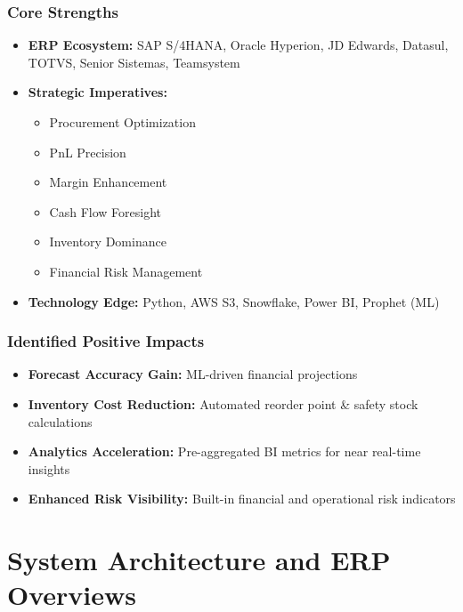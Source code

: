 \documentclass[a4paper,10pt]{article}
\begin{document}
\subsection{Core Strengths}
\begin{itemize}[leftmargin=2em]
    \item \textbf{ERP Ecosystem:} SAP S/4HANA, Oracle Hyperion, JD Edwards, Datasul, TOTVS, Senior Sistemas, Teamsystem
    \item \textbf{Strategic Imperatives:}
    \begin{itemize}[leftmargin=1.5em]
        \item Procurement Optimization
        \item PnL Precision
        \item Margin Enhancement
        \item Cash Flow Foresight
        \item Inventory Dominance
        \item Financial Risk Management
    \end{itemize}
    \item \textbf{Technology Edge:} Python, AWS S3, Snowflake, Power BI, Prophet (ML)
\end{itemize}

\subsection{Identified Positive Impacts}
\begin{itemize}[leftmargin=2em]
    \item \textbf{Forecast Accuracy Gain:} ML-driven financial projections
    \item \textbf{Inventory Cost Reduction:} Automated reorder point \& safety stock calculations
    \item \textbf{Analytics Acceleration:} Pre-aggregated BI metrics for near real-time insights
    \item \textbf{Enhanced Risk Visibility:} Built-in financial and operational risk indicators
\end{itemize}

\chapter{System Architecture and ERP Overviews}
\end{document}
